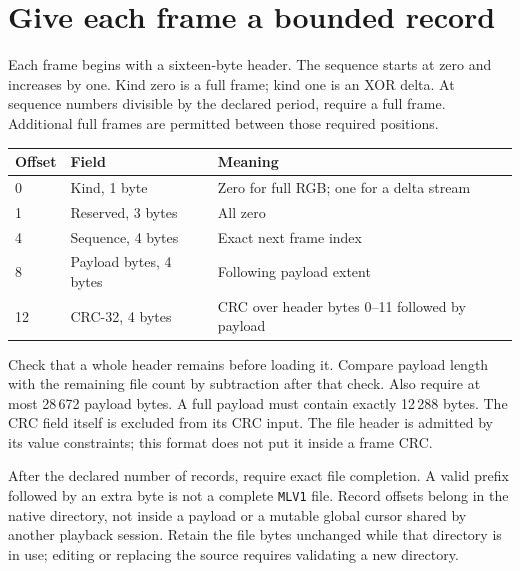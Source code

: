 \section{Give each frame a bounded record}
Each frame begins with a sixteen-byte header. The sequence starts at zero and
increases by one. Kind zero is a full frame; kind one is an XOR delta. At sequence
numbers divisible by the declared period, require a full frame. Additional full
frames are permitted between those required positions.
\begin{longtable}{p{18mm}p{43mm}p{85mm}}
  \toprule Offset & Field                  & Meaning                                         \\\midrule
  0               & Kind, 1 byte           & Zero for full RGB; one for a delta stream       \\
  1               & Reserved, 3 bytes      & All zero                                        \\
  4               & Sequence, 4 bytes      & Exact next frame index                          \\
  8               & Payload bytes, 4 bytes & Following payload extent                        \\
  12              & CRC-32, 4 bytes        & CRC over header bytes 0--11 followed by payload \\\bottomrule
\end{longtable}
Check that a whole header remains before loading it. Compare payload length with the
remaining file count by subtraction after that check. Also require at most 28\,672
payload bytes. A full payload must contain exactly 12\,288 bytes. The CRC field itself
is excluded from its CRC input. The file header is admitted by its value constraints;
this format does not put it inside a frame CRC.

After the declared number of records, require exact file completion. A valid prefix
followed by an extra byte is not a complete \texttt{MLV1} file. Record offsets belong
in the native directory, not inside a payload or a mutable global cursor shared by
another playback session. Retain the file bytes unchanged while that directory is
in use; editing or replacing the source requires validating a new directory.
